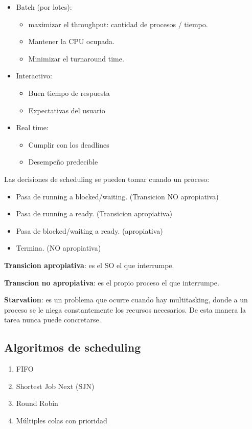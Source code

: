 \documentclass[a4paper, twoside]{article}
\begin{document}
\begin{itemize}
	\item Batch (por lotes):
	\begin{itemize}
		\item maximizar el throughput: cantidad de procesos / tiempo.
		\item Mantener la CPU ocupada.
		\item Minimizar el turnaround time.
	\end{itemize}
	\item Interactivo:
	\begin{itemize}
		\item Buen tiempo de respuesta
		\item Expectativas del usuario
	\end{itemize}
	\item Real time:
	\begin{itemize}
		\item Cumplir con los deadlines
		\item Desempeño predecible
	\end{itemize}
\end{itemize}

Las decisiones de scheduling se pueden tomar cuando un proceso:

\begin{itemize}
	\item Pasa de running a blocked/waiting. (Transicion NO apropiativa)
	\item Pasa de running a ready. (Transicion apropiativa)
	\item Pasa de blocked/waiting a ready. (apropiativa)
	\item Termina. (NO apropiativa)
\end{itemize}

\textbf{Transicion apropiativa}: es el SO el que interrumpe.

\textbf{Transcion no apropiativa}: es el propio proceso el que interrumpe.

\textbf{Starvation}: es un problema que ocurre cuando hay multitasking, donde a un proceso se le niega constantemente los recursos necesarios. De esta manera la tarea nunca puede concretarse.

\subsection{Algoritmos de scheduling}

\begin{enumerate}
	\item FIFO
	\item Shortest Job Next (SJN)
	\item Round Robin
	\item Múltiples colas con prioridad
\end{enumerate}
\end{document}
